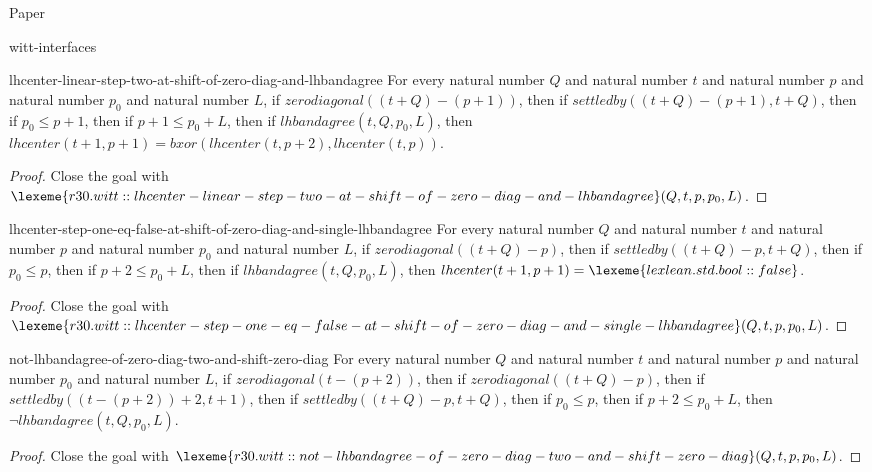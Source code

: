 \begin{lexlean}{Paper}
\begin{section}{witt-interfaces}
  \begin{theorem}{lhcenter-linear-step-two-at-shift-of-zero-diag-and-lhbandagree}
  For every natural number \(Q\) and natural number \(t\) and natural number \(p\) and natural number \(p_0\) and natural number \(L\), if \(zerodiagonal((t + Q) - (p + 1))\), then if \(settledby((t + Q) - (p + 1), t + Q)\), then if \(p_0 ≤ p + 1\), then if \(p + 1 ≤ p_0 + L\), then if \(lhbandagree(t, Q, p_0, L)\), then \(lhcenter(t + 1, p + 1) = bxor(lhcenter(t, p + 2), lhcenter(t, p))\).
  \begin{proof}
  Close the goal with \(\lexeme{r30.witt::lhcenter-linear-step-two-at-shift-of-zero-diag-and-lhbandagree}(Q, t, p, p_0, L)\).
  \end{proof}
  \end{theorem}

  \begin{theorem}{lhcenter-step-one-eq-false-at-shift-of-zero-diag-and-single-lhbandagree}
  For every natural number \(Q\) and natural number \(t\) and natural number \(p\) and natural number \(p_0\) and natural number \(L\), if \(zerodiagonal((t + Q) - p)\), then if \(settledby((t + Q) - p, t + Q)\), then if \(p_0 ≤ p\), then if \(p + 2 ≤ p_0 + L\), then if \(lhbandagree(t, Q, p_0, L)\), then \(lhcenter(t + 1, p + 1) = \lexeme{lexlean.std.bool::false}\).
  \begin{proof}
  Close the goal with \(\lexeme{r30.witt::lhcenter-step-one-eq-false-at-shift-of-zero-diag-and-single-lhbandagree}(Q, t, p, p_0, L)\).
  \end{proof}
  \end{theorem}

  \begin{theorem}{not-lhbandagree-of-zero-diag-two-and-shift-zero-diag}
  For every natural number \(Q\) and natural number \(t\) and natural number \(p\) and natural number \(p_0\) and natural number \(L\), if \(zerodiagonal(t - (p + 2))\), then if \(zerodiagonal((t + Q) - p)\), then if \(settledby((t - (p + 2)) + 2, t + 1)\), then if \(settledby((t + Q) - p, t + Q)\), then if \(p_0 ≤ p\), then if \(p + 2 ≤ p_0 + L\), then \(¬ lhbandagree(t, Q, p_0, L)\).
  \begin{proof}
  Close the goal with \(\lexeme{r30.witt::not-lhbandagree-of-zero-diag-two-and-shift-zero-diag}(Q, t, p, p_0, L)\).
  \end{proof}
  \end{theorem}


\end{section}
\end{lexlean}
